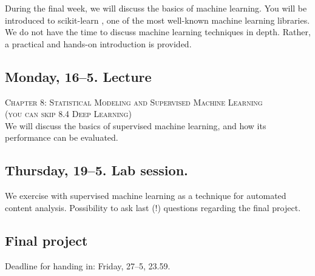 During the final week, we will discuss the basics of machine learning. You will be introduced to scikit-learn \citep{scikit-learn}, one of the most well-known machine learning libraries. We do not have the time to discuss machine learning techniques in depth. Rather, a practical and hands-on introduction is provided. 

\subsection*{Monday, 16--5. Lecture}
\textsc{ Chapter 8: Statistical Modeling and Supervised Machine Learning}\\
\textsc{ (you can skip 8.4 Deep Learning)}\\

We will discuss the basics of supervised machine learning, and how its performance can be evaluated. 

\subsection*{Thursday, 19--5. Lab session.}
We exercise with supervised machine learning as a technique for automated content analysis. Possibility to ask last (!) questions regarding the final project.

\subsection*{Final project}
Deadline for handing in: Friday, 27--5, 23.59.



